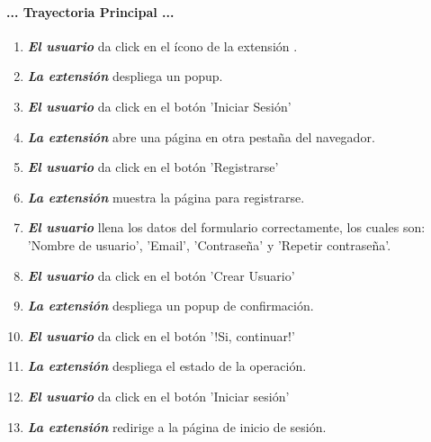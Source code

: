 \documentclass[12pt, a4paper, titlepage]{report}
\newcommand*{\img}[1]{%
    \raisebox{-.3\baselineskip}{%
        \texttt{[image: \#1]}%
    }%
}
\begin{document}
				\paragraph{... Trayectoria Principal ...}
				\begin{enumerate}
				    
				    \item \textbf{\textit{El usuario}} da click en el ícono de la extensión \img{imagenes/Disenio/Componente_1/UI_icon_escom.png}.
				    
				    \item \textbf{\textit{La extensión}} despliega un popup.
					
					\item \textbf{\textit{El usuario}} da click en el botón 'Iniciar Sesión' \img{imagenes/Disenio/Componente_1/UI_btn_login.png}
					
					\item \textbf{\textit{La extensión}} abre una página en otra pestaña del navegador.
					
					\item \textbf{\textit{El usuario}} da click en el botón 'Registrarse' \img{imagenes/Disenio/Componente_1/UI_btn_logup.png}
					
					\item \textbf{\textit{La extensión}} muestra la página para registrarse.
					
					\item \textbf{\textit{El usuario}} llena los datos del formulario correctamente, los cuales son: 'Nombre de usuario', 'Email', 'Contraseña' y 'Repetir contraseña'.
					
					\item \textbf{\textit{El usuario}} da click en el botón 'Crear Usuario' \img{imagenes/Disenio/Componente_1/UI_btn_newUser.png}
					
					\item \textbf{\textit{La extensión}} despliega un popup de confirmación.
					
					\item \textbf{\textit{El usuario}} da click en el botón '!Si, continuar!' \img{imagenes/Disenio/Componente_1/UI_btn_continueNewUser.png}
					
			        \item \textbf{\textit{La extensión}} despliega el estado de la operación.
			        
			        \item \textbf{\textit{El usuario}} da click en el botón 'Iniciar sesión' \img{imagenes/Disenio/Componente_1/UI_btn_login.png}
			        
			        \item \textbf{\textit{La extensión}} redirige a la página de inicio de sesión.
					
				\end{enumerate}
\end{document}
